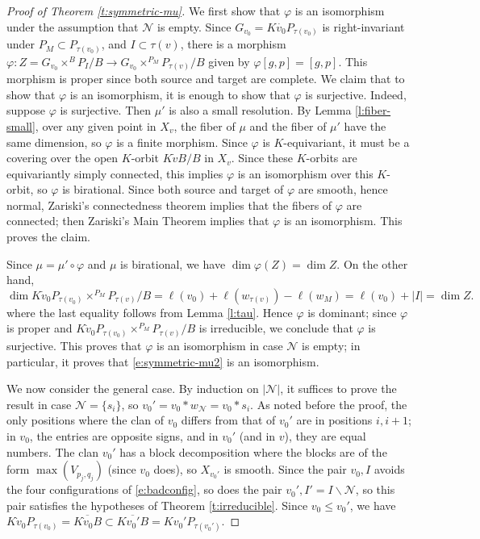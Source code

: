 \documentclass[10pt,a4paper]{amsart}
\newcommand{\cN}{\mathcal N}
\begin{document}
\begin{proof}[Proof of Theorem \ref{t:symmetric-mu}]
We first show that $\varphi$ is an isomorphism under the assumption that $\cN$ is empty.  
Since $G_{v_0} = K \dot{v_0} P_{\tau(v_0)}$  is right-invariant under $P_M \subset P_{\tau(v_0)}$,
and $I \subset \tau(v)$, there is a morphism $\varphi: Z = G_{v_0} \times^B P_I/B \to G_{v_0} \times^{P_M} P_{\tau(v)}/B$
given by \(\varphi[g,p]=[g,p]\).  This morphism is proper since both source and target are complete.
We claim that to show that $\varphi$ is an isomorphism, it is enough to show that $\varphi$ is surjective.
Indeed, suppose $\varphi$ is surjective.  Then $\mu'$ is also a small resolution. By Lemma \ref{l:fiber-small},
over any given point in $X_v$, the fiber of $\mu$ and the fiber of $\mu'$ have the same dimension, 
so $\varphi$ is a finite morphism.
Since $\varphi$ is $K$-equivariant, it must be a covering
over the open $K$-orbit $K \dot{v} B/B$ in $X_v$.  Since these $K$-orbits are equivariantly simply connected, this implies $\varphi$ is an isomorphism over
this $K$-orbit, so $\varphi$ is birational.  Since both source and target of $\varphi$ are smooth, hence
normal, Zariski's connectedness theorem implies that the fibers of $\varphi$ are connected; then Zariski's Main Theorem implies that
$\varphi$ is an isomorphism.  This proves the claim.

Since $\mu = \mu' \circ \varphi$ and $\mu$ is birational, we have $\dim \varphi(Z) = \dim Z$.  On the
other hand,
\begin{equation} \label{e:dimension}
\dim K \dot{v}_0P_{\tau(v_0)}\times^{P_M} P_{\tau(v)}/B = \ell(v_0) + \ell(w_{\tau(v)}) - \ell(w_M) = \ell(v_0) + | I | = \dim Z.
\end{equation}
where the last equality follows from Lemma \ref{l:tau}.  Hence $\varphi$ is dominant; since $\varphi$ is proper
and $K\dot{v}_0P_{\tau(v_0)}\times^{P_M} P_{\tau(v)}/B$ is irreducible, we conclude that $\varphi$ is surjective.
This proves that $\varphi$ is an isomorphism in case $\cN$ is empty; in particular, it proves that  \eqref{e:symmetric-mu2} is an isomorphism.

We now consider the general case.  By induction on $|\cN|$, it suffices to prove the result in case $\cN = \{ s_{i} \}$,
so $v_0' = v_0 * w_{\cN} = v_0 * s_{i}$.  As noted before the proof, the only positions where
the clan of $v_0$ differs from that of $v_0'$ are in positions $i, i+1$; in $v_0$, the entries are opposite signs, and
in $v_0'$ (and in $v$), they are equal numbers.  The clan $v_0'$ has a block decomposition where
the blocks are of the form $\max(V_{p_j,q_j})$ (since $v_0$ does), so $X_{v_0'}$ is smooth.  
Since the pair $v_0, I$ avoids the four configurations of  \eqref{e:badconfig}, so does the pair $v_0', I' = I \smallsetminus \cN$,
so this pair satisfies the hypotheses of Theorem \ref{t:irreducible}.  Since $v_0\leq v_0'$,
we have $K \dot{v}_0 P_{\tau(v_0)} = \overline{K \dot{v}_0B} \subset\overline{K{v_{0}'}B} = K v_0' P_{\tau(v_0')}$.


\end{proof}
\end{document}
